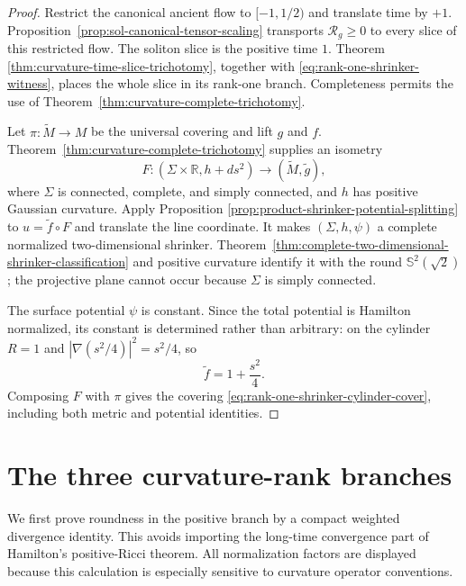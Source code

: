 \documentclass[10pt]{coll-l}
\newcommand{\R}{\mathbb{R}}
\newcommand{\Sph}{\mathbb{S}}
\theoremstyle{definition}
\theoremstyle{remark}
\numberwithin{section}{chapter}
\numberwithin{equation}{chapter}
\begin{document}
\begin{proof}
Restrict the canonical ancient flow to $[-1,1/2)$ and translate time by
$+1$.  Proposition~\ref{prop:sol-canonical-tensor-scaling} transports
$\mathcal R_g\geq0$ to every slice of this restricted flow.  The soliton
slice is the positive time $1$.  Theorem
\ref{thm:curvature-time-slice-trichotomy}, together with
\eqref{eq:rank-one-shrinker-witness}, places the whole slice in its
rank-one branch.  Completeness permits the use of
Theorem~\ref{thm:curvature-complete-trichotomy}.

Let $\pi:\widetilde M\to M$ be the universal covering and lift $g$ and
$f$.  Theorem~\ref{thm:curvature-complete-trichotomy} supplies an isometry
\[
       F:(\Sigma\times\R,h+ds^2)
             \longrightarrow(\widetilde M,\widetilde g),
\]
where $\Sigma$ is connected, complete, and simply connected, and $h$ has
positive Gaussian curvature.  Apply Proposition
\ref{prop:product-shrinker-potential-splitting} to
$u=\widetilde f\circ F$ and translate the line coordinate.  It makes
$(\Sigma,h,\psi)$ a complete normalized two-dimensional shrinker.
Theorem~\ref{thm:complete-two-dimensional-shrinker-classification} and
positive curvature identify it with the round $\Sph^2(\sqrt2)$; the
projective plane cannot occur because $\Sigma$ is simply connected.

The surface potential $\psi$ is constant.  Since the total potential is
Hamilton normalized, its constant is determined rather than arbitrary:
on the cylinder $R=1$ and $|\nabla(s^2/4)|^2=s^2/4$, so
\[
                    \widetilde f=1+\frac{s^2}{4}.
\]
Composing $F$ with $\pi$ gives the covering
\eqref{eq:rank-one-shrinker-cylinder-cover}, including both metric and
potential identities.
\end{proof}

\section{The three curvature-rank branches}
\label{sec:three-dimensional-shrinker-proof}

We first prove roundness in the positive branch by a compact weighted
divergence identity.  This avoids importing the long-time convergence part
of Hamilton's positive-Ricci theorem.  All normalization factors are
displayed because this calculation is especially sensitive to curvature
operator conventions.
\end{document}
